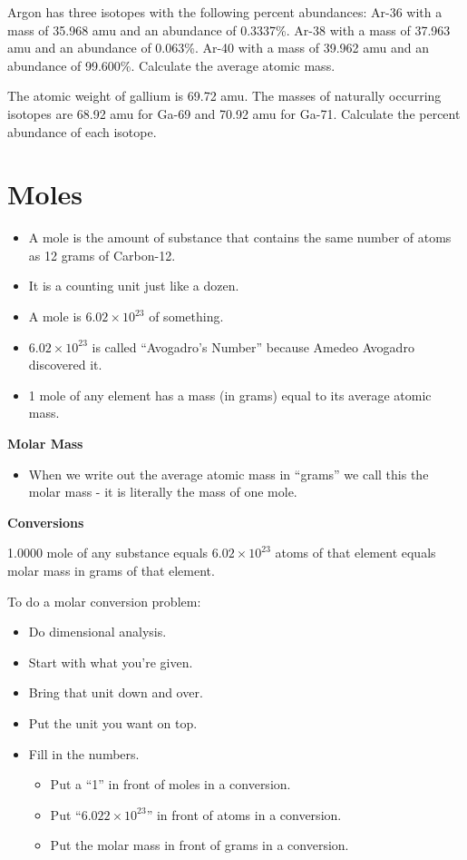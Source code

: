\documentclass[../hchem.tex]{subfiles}
\begin{document}
\ex Argon has three isotopes with the following percent abundances: Ar-36 with a mass of 
35.968 amu and an abundance of 0.3337\%. Ar-38 with a mass of 37.963 amu and an abundance of 0.063\%.
Ar-40 with a mass of 39.962 amu and an abundance of 99.600\%. Calculate the average atomic mass.

\ex The atomic weight of gallium is 69.72 amu. The masses of naturally occurring isotopes are 68.92 amu for Ga-69 
and 70.92 amu for Ga-71. Calculate the percent abundance of each isotope.

\section{Moles}
\begin{itemize}
    \item A mole is the amount of substance that contains the same number of atoms as 12 grams of Carbon-12.
    \item It is a counting unit just like a dozen.
    \item A mole is $6.02\times 10^{23}$ of something.
\end{itemize}

\begin{itemize}
    \item $6.02\times10^{23}$ is called ``Avogadro's Number'' because Amedeo Avogadro discovered it.
    \item 1 mole of any element has a mass (in grams) equal to its average atomic mass.
\end{itemize}

\textbf{Molar Mass}
\begin{itemize}
    \item When we write out the average atomic mass in ``grams'' we call this the molar mass - it is literally the mass of one mole.
\end{itemize}

\textbf{Conversions}

1.0000 mole of any substance equals $6.02\times10^{23}$ atoms of that element equals molar mass in grams of that element.

To do a molar conversion problem:
\begin{itemize}
    \item Do dimensional analysis.
    \item Start with what you're given.
    \item Bring that unit down and over.
    \item Put the unit you want on top.
    \item Fill in the numbers.
    \begin{itemize}
        \item Put a ``1'' in front of moles in a conversion.
        \item Put ``$6.022\times10^{23}$'' in front of atoms in a conversion.
        \item Put the molar mass in front of grams in a conversion.
    \end{itemize}
\end{itemize}
\end{document}
